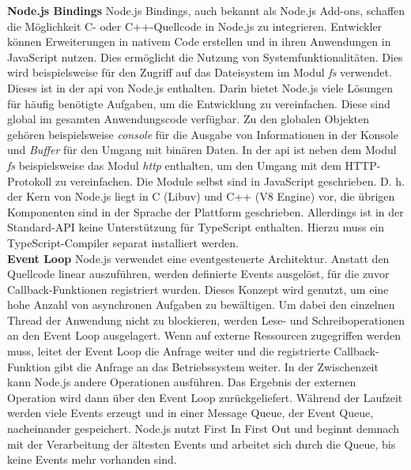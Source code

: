 \noindent
\textbf{Node.js Bindings} \newline
Node.js Bindings, auch bekannt als Node.js Add-ons, schaffen die Möglichkeit C- oder C++-Quellcode in Node.js zu integrieren. Entwickler können Erweiterungen in nativem Code erstellen und in ihren Anwendungen in JavaScript nutzen. Dies ermöglicht die Nutzung von Systemfunktionalitäten. Dies wird beispielsweise für den Zugriff auf das Dateisystem im Modul \textit{fs} verwendet. Dieses ist in der \ac{api} von Node.js enthalten. Darin bietet Node.js viele Lösungen für häufig benötigte Aufgaben, um die Entwicklung zu vereinfachen. Diese sind global im gesamten Anwendungscode verfügbar. Zu den globalen Objekten gehören beispielsweise \textit{console} für die Ausgabe von Informationen in der Konsole und \textit{Buffer} für den Umgang mit binären Daten. In der \ac{api} ist neben dem Modul \textit{fs} beispielsweise das Modul \textit{http} enthalten, um den Umgang mit dem HTTP-Protokoll zu vereinfachen. Die Module selbst sind in JavaScript geschrieben. D. h. der Kern von Node.js liegt in C (Libuv) und C++ (V8 Engine)  vor, die übrigen Komponenten sind in der Sprache der Plattform geschrieben. Allerdings ist in der Standard-API keine Unterstützung für TypeScript enthalten. Hierzu muss ein TypeScript-Compiler separat installiert werden.\cite{Springer.2022, OpenJSFoundation.2022b, OpenJSFoundation.o.J.b}\\

\noindent
\textbf{Event Loop} \newline
Node.js verwendet eine eventgesteuerte Architektur. Anstatt den Quellcode linear auszuführen, werden definierte Events ausgelöst, für die zuvor Callback-Funktionen registriert wurden. Dieses Konzept wird genutzt, um eine hohe Anzahl von asynchronen Aufgaben zu bewältigen. Um dabei den einzelnen Thread der Anwendung nicht zu blockieren, werden Lese- und Schreiboperationen an den Event Loop ausgelagert.  Wenn auf externe Ressourcen zugegriffen werden muss, leitet der Event Loop die Anfrage weiter und die registrierte Callback-Funktion gibt die Anfrage an das Betriebssystem weiter. In der Zwischenzeit kann Node.js andere Operationen ausführen. Das Ergebnis der externen Operation wird dann über den Event Loop zurückgeliefert.\cite{Springer.2022} \newline 
Während der Laufzeit werden viele Events erzeugt und in einer Message Queue, der Event Queue, nacheinander gespeichert. Node.js nutzt First In First Out  und beginnt demnach mit der Verarbeitung der ältesten Events und arbeitet sich durch die Queue, bis keine Events mehr vorhanden sind.\cite{OpenJSFoundation.o.J.c}\\

